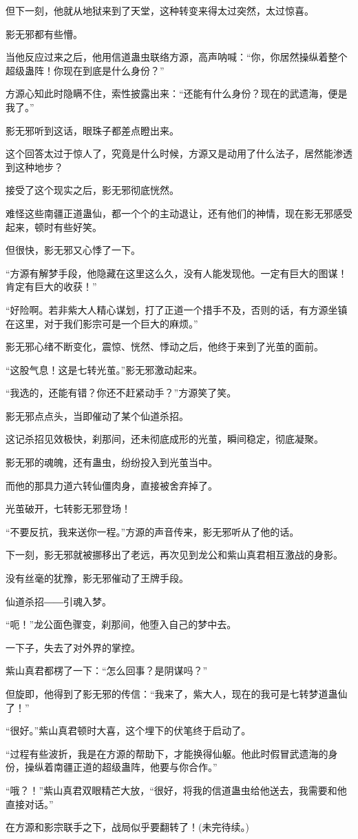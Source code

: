 \begin{this_body}
但下一刻，他就从地狱来到了天堂，这种转变来得太过突然，太过惊喜。

影无邪都有些懵。

当他反应过来之后，他用信道蛊虫联络方源，高声呐喊：“你，你居然操纵着整个超级蛊阵！你现在到底是什么身份？”

方源心知此时隐瞒不住，索性披露出来：“还能有什么身份？现在的武遗海，便是我了。”

影无邪听到这话，眼珠子都差点瞪出来。

这个回答太过于惊人了，究竟是什么时候，方源又是动用了什么法子，居然能渗透到这种地步？

接受了这个现实之后，影无邪彻底恍然。

难怪这些南疆正道蛊仙，都一个个的主动退让，还有他们的神情，现在影无邪感受起来，顿时有些好笑。

但很快，影无邪又心悸了一下。

“方源有解梦手段，他隐藏在这里这么久，没有人能发现他。一定有巨大的图谋！肯定有巨大的收获！”

“好险啊。若非紫大人精心谋划，打了正道一个措手不及，否则的话，有方源坐镇在这里，对于我们影宗可是一个巨大的麻烦。”

影无邪心绪不断变化，震惊、恍然、悸动之后，他终于来到了光茧的面前。

“这股气息！这是七转光茧。”影无邪激动起来。

“我选的，还能有错？你还不赶紧动手？”方源笑了笑。

影无邪点点头，当即催动了某个仙道杀招。

这记杀招见效极快，刹那间，还未彻底成形的光茧，瞬间稳定，彻底凝聚。

影无邪的魂魄，还有蛊虫，纷纷投入到光茧当中。

而他的那具力道六转仙僵肉身，直接被舍弃掉了。

光茧破开，七转影无邪登场！

“不要反抗，我来送你一程。”方源的声音传来，影无邪听从了他的话。

下一刻，影无邪就被挪移出了老远，再次见到龙公和紫山真君相互激战的身影。

没有丝毫的犹豫，影无邪催动了王牌手段。

仙道杀招――引魂入梦。

“呃！”龙公面色骤变，刹那间，他堕入自己的梦中去。

一下子，失去了对外界的掌控。

紫山真君都楞了一下：“怎么回事？是阴谋吗？”

但旋即，他得到了影无邪的传信：“我来了，紫大人，现在的我可是七转梦道蛊仙了！”

“很好。”紫山真君顿时大喜，这个埋下的伏笔终于启动了。

“过程有些波折，我是在方源的帮助下，才能换得仙躯。他此时假冒武遗海的身份，操纵着南疆正道的超级蛊阵，他要与你合作。”

“哦？！”紫山真君双眼精芒大放，“很好，将我的信道蛊虫给他送去，我需要和他直接对话。”

在方源和影宗联手之下，战局似乎要翻转了！(未完待续。)

\end{this_body}

